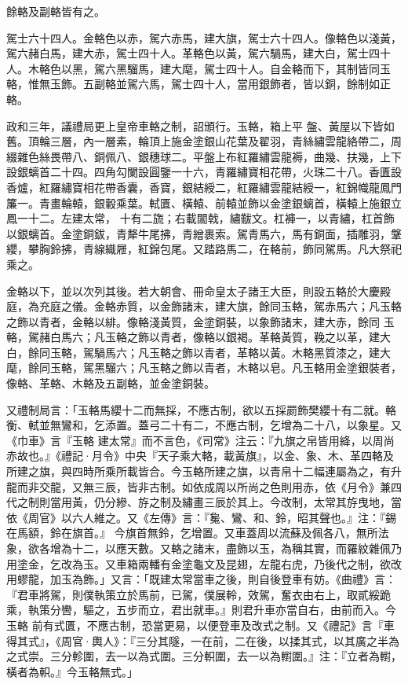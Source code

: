 \begin{pinyinscope}
 餘輅及副輅皆有之。



 駕士六十四人。金輅色以赤，駕六赤馬，建大旗，駕士六十四人。像輅色以淺黃，駕六赭白馬，建大赤，駕士四十人。革輅色以黃，駕六騧馬，建大白，駕士四十人。木輅色以黑，駕六黑騮馬，建大麾，駕士四十人。自金輅而下，其制皆同玉輅，惟無玉飾。五副輅並駕六馬，駕士四十人，當用銀飾者，皆以銅，餘制如正輅。



 政和三年，議禮局更上皇帝車輅之制，詔頒行。玉輅，箱上平
 盤、黃屋以下皆如舊。頂輪三層，內一層素，輪頂上施金塗銀山花葉及翟羽，青絲繡雲龍絡帶二，周綴雜色絲畏帶八、銅佩八、銀穗球二。平盤上布紅羅繡雲龍褥，曲幾、扶幾，上下設銀螭首二十四。四角勾闌設圓鑒一十六，青羅繡寶相花帶，火珠二十八。香匱設香爐，紅羅繡寶相花帶香囊，香寶，銀結綬二，紅羅繡雲龍結綬一，紅錦幟龍鳳門簾一。青畫輪轅，銀轂乘葉。軾匱、橫轅、前轅並飾以金塗銀螭首，橫轅上施銀立鳳一十二。左建太常，
 十有二旒；右載闟戟，繡黻文。杠褲一，以青繡，杠首飾以銀螭首。金塗銅鈸，青犛牛尾拂，青繒裹索。駕青馬六，馬有銅面，插雕羽，鞶纓，攀胸鈴拂，青線織屜，紅錦包尾。又踏路馬二，在輅前，飾同駕馬。凡大祭祀乘之。



 金輅以下，並以次列其後。若大朝會、冊命皇太子諸王大臣，則設五輅於大慶殿庭，為充庭之儀。金輅赤質，以金飾諸末，建大旗，餘同玉輅，駕赤馬六；凡玉輅之飾以青者，金輅以緋。像輅淺黃質，金塗銅裝，以象飾諸末，建大赤，餘同
 玉輅，駕赭白馬六；凡玉輅之飾以青者，像輅以銀褐。革輅黃質，鞔之以革，建大白，餘同玉輅，駕騧馬六；凡玉輅之飾以青者，革輅以黃。木輅黑質漆之，建大麾，餘同玉輅，駕黑騮六；凡玉輅之飾以青者，木輅以皂。凡玉輅用金塗銀裝者，像輅、革輅、木輅及五副輅，並金塗銅裝。



 又禮制局言：「玉輅馬纓十二而無採，不應古制，欲以五採罽飾樊纓十有二就。輅衡、軾並無鸞和，乞添置。蓋弓二十有二，不應古制，乞增為二十八，以象星。又《巾車》言『玉輅
 建太常』而不言色，《司常》注云：『九旗之帛皆用絳，以周尚赤故也。』《禮記·月令》中央『天子乘大輅，載黃旗』，以金、象、木、革四輅及所建之旗，與四時所乘所載皆合。今玉輅所建之旗，以青帛十二幅連屬為之，有升龍而非交龍，又無三辰，皆非古制。如依成周以所尚之色則用赤，依《月令》兼四代之制則當用黃，仍分縿、斿之制及繡畫三辰於其上。今改制，太常其斿曳地，當依《周官》以六人維之。又《左傳》言：『毚、鸞、和、鈴，昭其聲也。』注：『錫在馬額，鈴在旗首。』
 今旗首無鈴，乞增置。又車蓋周以流蘇及佩各八，無所法象，欲各增為十二，以應天數。又輅之諸末，盡飾以玉，為稱其實，而羅紋雜佩乃用塗金，乞改為玉。又車箱兩轓有金塗龜文及昆翅，左龍右虎，乃後代之制，欲改用蟉龍，加玉為飾。」又言：「既建太常當車之後，則自後登車有妨。《曲禮》言：『君車將駕，則僕執策立於馬前，已駕，僕展軨，效駕，奮衣由右上，取貳綏跪乘，執策分轡，驅之，五步而立，君出就車。』則君升車亦當自右，由前而入。今玉輅
 前有式匱，不應古制，恐當更易，以便登車及改式之制。又《禮記》言『車得其式』，《周官·輿人》：『三分其隧，一在前，二在後，以揉其式，以其廣之半為之式崇。三分軫圍，去一以為式圍。三分軹圍，去一以為轛圍。』注：『立者為轛，橫者為軹。』今玉輅無式。」




\end{pinyinscope}
